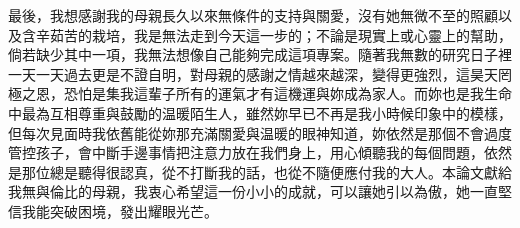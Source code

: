 \bigskip

最後，我想感謝我的⺟親⻑久以來無條件的⽀持與關愛，沒有她無微不⾄的照顧以及含⾟茹苦的栽培，我是無法走到今天這⼀步的；不論是現實上或⼼靈上的幫助，倘若缺少其中⼀項，我無法想像⾃⼰能夠完成這項專案。隨著我無數的研究⽇⼦裡⼀天⼀天過去更是不證⾃明，對⺟親的感謝之情越來越深，變得更強烈，這昊天罔極之恩，恐怕是集我這輩⼦所有的運氣才有這機運與妳成為家⼈。而妳也是我⽣命中最為互相尊重與⿎勵的温暖陌⽣⼈，雖然妳早已不再是我小時候印象中的模樣，但每次⾒⾯時我依舊能從妳那充滿關愛與温暖的眼神知道，妳依然是那個不會過度管控孩⼦，會中斷⼿邊事情把注意⼒放在我們⾝上，⽤⼼傾聽我的每個問題，依然是那位總是聽得很認真，從不打斷我的話，也從不隨便應付我的⼤⼈。本論⽂獻給我無與倫⽐的⺟親，我衷⼼希望這⼀份小小的成就，可以讓她引以為傲，她⼀直堅信我能突破困境，發出耀眼光芒。